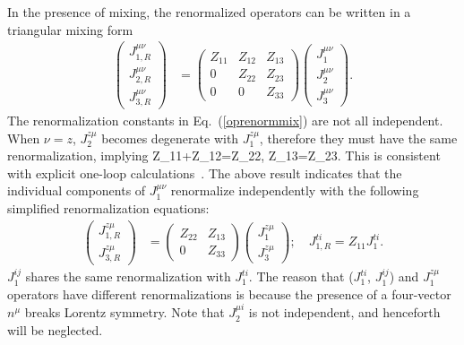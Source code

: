 In the presence of mixing, the renormalized operators can be written in a triangular mixing form
\begin{align}\label{oprenormmix}
\begin{pmatrix}
 J_{1, R}^{\mu\nu} \\  J_{2, R}^{\mu\nu} \\ J_{3, R}^{\mu\nu}
\end{pmatrix}
&=
\begin{pmatrix}
Z_{11} & Z_{12} & Z_{13}\\ 0 & Z_{22} & Z_{23} \\ 0 & 0 & Z_{33}
\end{pmatrix}
\begin{pmatrix}
 J_1^{\mu\nu}\\  J_2^{\mu\nu} \\ J_3^{\mu\nu}
\end{pmatrix}.
\end{align}
The renormalization constants in Eq.~(\ref{oprenormmix}) are not all independent. When $\nu=z$, $J_2^{z\mu}$ becomes degenerate with $J_1^{z\mu}$,
therefore they must have the same renormalization, implying
\beq\label{Zrelation}
Z_{11}+Z_{12}=Z_{22}, \hspace{5em} Z_{13}=Z_{23}.
\eeq
This is consistent with explicit one-loop calculations~\cite{Dorn:1981wa}.
The above result indicates that the individual components of $J_1^{\mu\nu}$ renormalize independently with the following simplified renormalization equations:
\begin{align}\label{oprenormmixsim2x2}
\begin{pmatrix}
 J_{1, R}^{z\mu} \\ J_{3, R}^{z\mu}
\end{pmatrix}
&=
\begin{pmatrix}
Z_{22} & Z_{13} \\  0 & Z_{33}
\end{pmatrix}
\begin{pmatrix}
 J_1^{z\mu} \\ J_3^{z\mu}
\end{pmatrix};\hspace{1em}
J_{1, R}^{ti}=Z_{11} J_1^{ti}.
\end{align}
$J_{1}^{ij}$ shares the same renormalization with $J_{1}^{ti}$. The reason that
($J_{1}^{ti}$, $J_{1}^{ij}$) and $J_1^{z\mu}$ operators have different renormalizations is because the presence of a four-vector $n^\mu$ breaks Lorentz symmetry. Note that $J_2^{\mu i}$ is not independent, and henceforth will be neglected.

